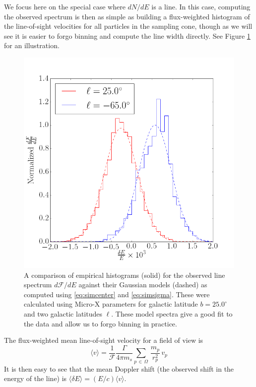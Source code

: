 \documentclass[aps,prl,10pt,twocolumn,superscriptaddress,showpacs]{revtex4-1}
\begin{document}
{We focus here on the special case where
$dN/dE$ is a line. In this case, computing the observed spectrum is then as simple as
building a flux-weighted histogram of the line-of-sight velocities for all particles in the sampling cone,
though as we will see it is easier to forgo binning and compute the line width directly. See Figure
\ref{fig:dfde} for an illustration.

\begin{figure}[h!]
\centering
\includegraphics[width=1.0\columnwidth]{dnde_demo.png}
\caption{A comparison of empirical histograms (solid) for the observed line spectrum
	$d\mathcal{F}/dE$ against their Gaussian models (dashed) as computed using \eqref{eq:simcenter} and \eqref{eq:simsigma}.
	These were calculated using Micro-X parameters for galactic latitude $b=25.0^\circ$ and two galactic
	latitudes $\ell$. These model spectra give a good fit to the data and allow us to forgo
	binning in practice.}
\label{fig:dfde}
\end{figure}

The flux-weighted mean line-of-sight velocity for a field of view is 
\begin{equation} 
	\langle v\rangle =\frac{1}{\mathcal{F}} \frac{\Gamma}{4\pi m_s} \sum_{p \, \in \, \Omega}
	\, \frac{m_p}{r_p^{2}} \, v_p
\label{eq:simcenter}
\end{equation}
It is then easy to see that the mean Doppler shift (the observed shift in the energy of the line) is  
	$\langle \delta E\rangle = (E/c)\langle v \rangle$.

}
\end{document}
